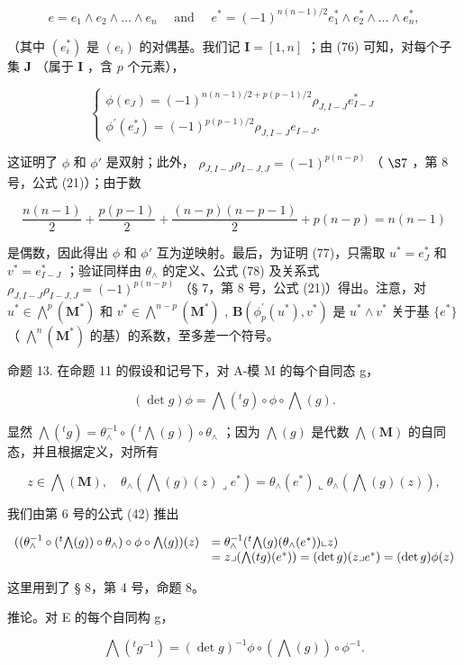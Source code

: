 \[
e = e _ {1} \wedge e _ {2} \wedge \dots \wedge e _ {n} \quad \text { and } \quad e ^ {*} = (- 1) ^ {n (n - 1) / 2} e _ {1} ^ {*} \wedge e _ {2} ^ {*} \wedge \dots \wedge e _ {n} ^ {*},
\]

（其中 \((e_i^*)\) 是 \((e_i)\) 的对偶基。我们记 \(\mathbf{I} = [1, n]\) ；由 (76) 可知，对每个子集 \(\mathbf{J}\) （属于 \(\mathbf{I}\) ，含 \(p\) 个元素），

\[
\left\{ \begin{array}{l} \phi (e _ {J}) = (- 1) ^ {n (n - 1) / 2 + p (p - 1) / 2} \rho_ {J, I - J} e _ {I - J} ^ {*} \\ \phi^ {\prime} (e _ {J} ^ {*}) = (- 1) ^ {p (p - 1) / 2} \rho_ {J, I - J} e _ {I - J}. \end{array} \right.\tag{78}
\]

这证明了 \(\phi\) 和 \(\phi'\) 是双射；此外， \(\rho_{J,I-J}\rho_{I-J,J}=(-1)^{p(n-p)}\) （ \(\S 7\) ，第 8 号，公式 (21)）；由于数

\[
\frac {n (n - 1)}{2} + \frac {p (p - 1)}{2} + \frac {(n - p) (n - p - 1)}{2} + p (n - p) = n (n - 1)
\]

是偶数，因此得出 \(\phi\) 和 \(\phi'\) 互为逆映射。最后，为证明 (77)，只需取 \(u^{*} = e_{J}^{*}\) 和 \(v^{*} = e_{I - J}^{*}\) ；验证同样由 \(\theta_{\wedge}\) 的定义、公式 (78) 及关系式 \(\rho_{J,I - J}\rho_{I - J,J} = (-1)^{p(n - p)}\) （§ 7，第 8 号，公式 (21)）得出。注意，对 \(u^{*}\in \bigwedge^{p}(\mathbf{M}^{*})\) 和 \(v^{*}\in \bigwedge^{n - p}(\mathbf{M}^{*})\) , \(\mathbf{B}(\phi_{p}^{\prime}(u^{*}), v^{*})\) 是 \(u^{*} \wedge v^{*}\) 关于基 \(\{e^{*}\}\) （ \(\bigwedge^{n}(\mathbf{M}^{*})\) 的基）的系数，至多差一个符号。

命题 13. 在命题 11 的假设和记号下，对 A-模 M 的每个自同态 g，

\[
(\det g) \phi = \bigwedge (^ {t} g) \circ \phi \circ \bigwedge (g).\tag{79}
\]

显然 \(\bigwedge(^{t}g) = \theta_{\wedge}^{-1}\circ (^{t}\bigwedge (g))\circ \theta_{\wedge}\) ；因为 \(\bigwedge (g)\) 是代数 \(\bigwedge (\mathbf{M})\) 的自同态，并且根据定义，对所有

\[
z \in \bigwedge (\mathbf {M}), \quad \theta_ {\wedge} (\bigwedge (g) (z) \lrcorner e ^ {*}) = \theta_ {\wedge} (e ^ {*}) \llcorner \theta_ {\wedge} (\bigwedge (g) (z)),
\]

我们由第 6 号的公式 (42) 推出

\[
\begin{array}{r l} ((\theta_ {\wedge} ^ {- 1} \circ (^ {t} \bigwedge (g)) \circ \theta_ {\wedge}) \circ \phi \circ \bigwedge (g)) (z) & = \theta_ {\wedge} ^ {- 1} (^ {t} \bigwedge (g) (\theta_ {\wedge} (e ^ {*})) \llcorner z) \\ & = z \lrcorner (\bigwedge (t g) (e ^ {*})) = (\det g) (z \lrcorner e ^ {*}) = (\det g) \phi (z) \end{array}
\]

这里用到了 § 8，第 4 号，命题 8。

推论。对 E 的每个自同构 g，

\[
\bigwedge(^ {t} g ^ {- 1}) = (\det g) ^ {- 1} \phi \circ (\bigwedge (g)) \circ \phi^ {- 1}.\tag{80}
\]

